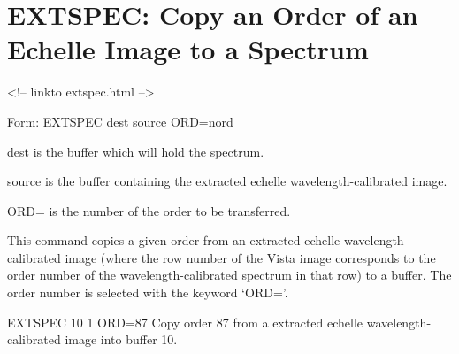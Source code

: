 \section{EXTSPEC: Copy an Order of an Echelle Image to a Spectrum}
\begin{rawhtml}
<!-- linkto extspec.html -->
\end{rawhtml}
\begin{command}
  \item[Form: EXTSPEC dest source ORD=nord\hfill]{}
  \item[dest]{is the buffer which will hold the spectrum.}
  \item[source]{is the buffer containing the extracted
       echelle wavelength-calibrated image.}
  \item[ORD=]{is the number of the order to be transferred.}
\end{command}

This command copies a given order from an extracted echelle
wavelength-calibrated image (where the row number of the Vista image
corresponds to the order number of the wavelength-calibrated spectrum in
that row) to a buffer. The order number is selected with the keyword
`ORD='.

\begin{example}
  \item[EXTSPEC 10 1 ORD=87\hfill]{ Copy order 87 from a extracted echelle
       wavelength-calibrated image into buffer 10.}
\end{example}
